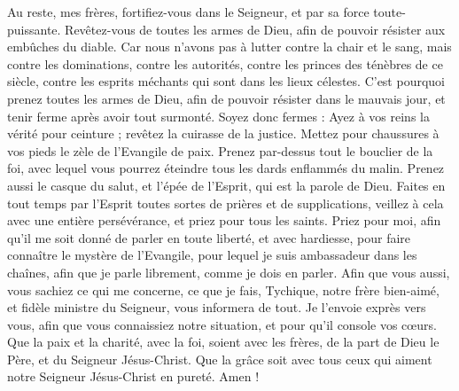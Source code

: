 \begin{multicols}{2}
Au reste, mes frères, fortifiez-vous dans le Seigneur, et par sa force toute-puissante.
Revêtez-vous de toutes les armes de Dieu, afin de pouvoir résister aux embûches du diable.
Car nous n'avons pas à lutter contre la chair et le sang, mais contre les dominations, contre les autorités, contre les princes des ténèbres de ce siècle, contre les esprits méchants qui sont dans les lieux célestes.
C'est pourquoi prenez toutes les armes de Dieu, afin de pouvoir résister dans le mauvais jour, et tenir ferme après avoir tout surmonté.
Soyez donc fermes : Ayez à vos reins la vérité pour ceinture ; revêtez la cuirasse de la justice.
Mettez pour chaussures à vos pieds le zèle de l'Evangile de paix.
Prenez par-dessus tout le bouclier de la foi, avec lequel vous pourrez éteindre tous les dards enflammés du malin.
Prenez aussi le casque du salut, et l'épée de l'Esprit, qui est la parole de Dieu.
Faites en tout temps par l’Esprit toutes sortes de prières et de supplications, veillez à cela avec une entière persévérance, et priez pour tous les saints.
Priez pour moi, afin qu'il me soit donné de parler en toute liberté, et avec hardiesse, pour faire connaître le mystère de l'Evangile,
pour lequel je suis ambassadeur dans les chaînes, afin que je parle librement, comme je dois en parler.
Afin que vous aussi, vous sachiez ce qui me concerne, ce que je fais, Tychique, notre frère bien-aimé, et fidèle ministre du Seigneur, vous informera de tout.
Je l’envoie exprès vers vous, afin que vous connaissiez notre situation, et pour qu'il console vos cœurs.
Que la paix et la charité, avec la foi, soient avec les frères, de la part de Dieu le Père, et du Seigneur Jésus-Christ.
Que la grâce soit avec tous ceux qui aiment notre Seigneur Jésus-Christ en pureté. Amen !
\PPE{}
\end{multicols}
